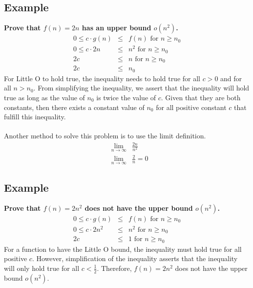 \subsection{Example}
\textbf{Prove that $f(n) = 2n$ has an upper bound $o(n^2)$.}
\begin{eqnarray*}
	0 \leq c \cdot g(n) &\leq& f(n) \text{ for } n \geq n_0\\
	0 \leq c \cdot 2n &\leq& n^2 \text{ for } n \geq n_0\\
	2c &\leq& n \text{ for } n \geq n_0\\
	2c &\leq& n_0
\end{eqnarray*}
For Little O to hold true, the inequality needs to hold true for all $c > 0$ and for all $n > n_0$. From simplifying the inequality, we assert that the inequality will hold true as long as the value of $n_0$ is twice the value of $c$. Given that they are both constants, then there exists a constant value of $n_0$ for all positive constant $c$ that fulfill this inequality.\\\\
Another method to solve this problem is to use the limit definition.
\begin{eqnarray*}
	&\lim\limits_{n\to\infty}& \frac{2n}{n^2}\\
	&\lim\limits_{n\to\infty}& \frac{2}{n} = 0	
\end{eqnarray*}

\newpage

\subsection{Example}
\textbf{Prove that $f(n) = 2n^2$ does not have the upper bound $o(n^2)$.}
\begin{eqnarray*}
	0 \leq c \cdot g(n) &\leq& f(n) \text{ for } n \geq n_0\\
	0 \leq c \cdot 2n^2 &\leq& n^2 \text{ for } n \geq n_0\\
	2c &\leq& 1\text{ for } n \geq n_0
\end{eqnarray*}
For a function to have the Little O bound, the inequality must hold true for all positive $c$. However, simplification of the inequality asserts that the inequality will only hold true for all $c < \frac{1}{2}$. Therefore, $f(n) = 2n^2$ does not have the upper bound $o(n^2)$.